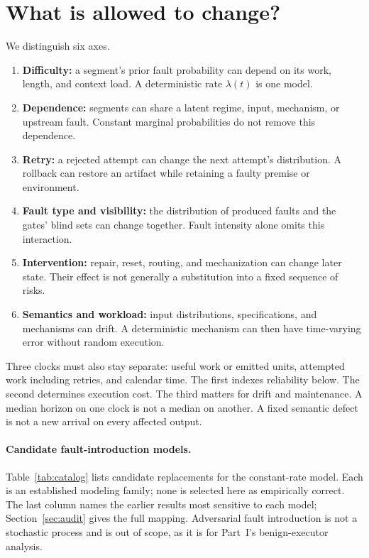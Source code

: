 \documentclass[11pt]{article}
\theoremstyle{definition}
\theoremstyle{remark}
\begin{document}
\section{What is allowed to change?}\label{sec:axes}
We distinguish six axes.
\begin{enumerate}[leftmargin=*,itemsep=2pt]
\item \textbf{Difficulty:} a segment's prior fault probability can depend on its work, length,
and context load. A deterministic rate $\lambda(t)$ is one model.
\item \textbf{Dependence:} segments can share a latent regime, input, mechanism, or upstream fault.
Constant marginal probabilities do not remove this dependence.
\item \textbf{Retry:} a rejected attempt can change the next attempt's distribution. A rollback
can restore an artifact while retaining a faulty premise or environment.
\item \textbf{Fault type and visibility:} the distribution of produced faults and the gates'
blind sets can change together. Fault intensity alone omits this interaction.
\item \textbf{Intervention:} repair, reset, routing, and mechanization can change later state.
Their effect is not generally a substitution into a fixed sequence of risks.
\item \textbf{Semantics and workload:} input distributions, specifications, and mechanisms can
drift. A deterministic mechanism can then have time-varying error without random execution.
\end{enumerate}

Three clocks must also stay separate: useful work or emitted units, attempted work including
retries, and calendar time. The first indexes reliability below. The second determines execution
cost. The third matters for drift and maintenance. A median horizon on one clock is not a
median on another. A fixed semantic defect is not a new arrival on every affected output.

\paragraph{Candidate fault-introduction models.}
Table~\ref{tab:catalog} lists candidate replacements for the constant-rate model. Each is an
established modeling family; none is selected here as empirically correct. The last column names
the earlier results most sensitive to each model; Section~\ref{sec:audit} gives the full mapping.
Adversarial fault introduction is not a stochastic process and is out of scope, as it is for
Part~I's benign-executor analysis.
\end{document}
